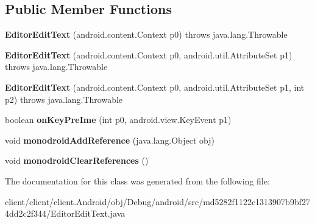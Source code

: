 \subsection*{Public Member Functions}
\begin{DoxyCompactItemize}
\item 
\hypertarget{classmd5282f1122c1313907b9bf274dd2c2f344_1_1EditorEditText_a655c5955a6205d21117285b614bdfd97}{}{\bfseries Editor\+Edit\+Text} (android.\+content.\+Context p0)  throws java.\+lang.\+Throwable 	\label{classmd5282f1122c1313907b9bf274dd2c2f344_1_1EditorEditText_a655c5955a6205d21117285b614bdfd97}

\item 
\hypertarget{classmd5282f1122c1313907b9bf274dd2c2f344_1_1EditorEditText_aa95179a38cf243a6ea7a09635cf19432}{}{\bfseries Editor\+Edit\+Text} (android.\+content.\+Context p0, android.\+util.\+Attribute\+Set p1)  throws java.\+lang.\+Throwable 	\label{classmd5282f1122c1313907b9bf274dd2c2f344_1_1EditorEditText_aa95179a38cf243a6ea7a09635cf19432}

\item 
\hypertarget{classmd5282f1122c1313907b9bf274dd2c2f344_1_1EditorEditText_aa3cfb0be3aa062c785008f96defa1606}{}{\bfseries Editor\+Edit\+Text} (android.\+content.\+Context p0, android.\+util.\+Attribute\+Set p1, int p2)  throws java.\+lang.\+Throwable 	\label{classmd5282f1122c1313907b9bf274dd2c2f344_1_1EditorEditText_aa3cfb0be3aa062c785008f96defa1606}

\item 
\hypertarget{classmd5282f1122c1313907b9bf274dd2c2f344_1_1EditorEditText_af183ee0b98b97c94fd5fafaba6673abb}{}boolean {\bfseries on\+Key\+Pre\+Ime} (int p0, android.\+view.\+Key\+Event p1)\label{classmd5282f1122c1313907b9bf274dd2c2f344_1_1EditorEditText_af183ee0b98b97c94fd5fafaba6673abb}

\item 
\hypertarget{classmd5282f1122c1313907b9bf274dd2c2f344_1_1EditorEditText_acba3f962d9437580208abe3cfa3141b3}{}void {\bfseries monodroid\+Add\+Reference} (java.\+lang.\+Object obj)\label{classmd5282f1122c1313907b9bf274dd2c2f344_1_1EditorEditText_acba3f962d9437580208abe3cfa3141b3}

\item 
\hypertarget{classmd5282f1122c1313907b9bf274dd2c2f344_1_1EditorEditText_a13968096c6a2825ef27486b33008081c}{}void {\bfseries monodroid\+Clear\+References} ()\label{classmd5282f1122c1313907b9bf274dd2c2f344_1_1EditorEditText_a13968096c6a2825ef27486b33008081c}

\end{DoxyCompactItemize}


The documentation for this class was generated from the following file\+:\begin{DoxyCompactItemize}
\item 
client/client/client.\+Android/obj/\+Debug/android/src/md5282f1122c1313907b9bf274dd2c2f344/Editor\+Edit\+Text.\+java\end{DoxyCompactItemize}
